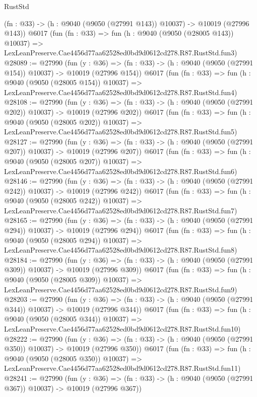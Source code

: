 \begin{lexlean}{RustStd}
\begin{coremodule}
{{    (fn : @33) -> (h : @9040 (@9050 (@27991 @143)) @10037) -> @10019 (@27996 @143))
    @6017
    (fun (fn : @33) =>
    fun (h : @9040 (@9050 (@28005 @143)) @10037) =>
    LexLeanPreserve.Cae4456d77aa62528ed0bd9d0612cd278.R87.RustStd.fun3)
@28089 := @27990
    (fun (y : @36) =>
    (fn : @33) -> (h : @9040 (@9050 (@27991 @154)) @10037) -> @10019 (@27996 @154))
    @6017
    (fun (fn : @33) =>
    fun (h : @9040 (@9050 (@28005 @154)) @10037) =>
    LexLeanPreserve.Cae4456d77aa62528ed0bd9d0612cd278.R87.RustStd.fun4)
@28108 := @27990
    (fun (y : @36) =>
    (fn : @33) -> (h : @9040 (@9050 (@27991 @202)) @10037) -> @10019 (@27996 @202))
    @6017
    (fun (fn : @33) =>
    fun (h : @9040 (@9050 (@28005 @202)) @10037) =>
    LexLeanPreserve.Cae4456d77aa62528ed0bd9d0612cd278.R87.RustStd.fun5)
@28127 := @27990
    (fun (y : @36) =>
    (fn : @33) -> (h : @9040 (@9050 (@27991 @207)) @10037) -> @10019 (@27996 @207))
    @6017
    (fun (fn : @33) =>
    fun (h : @9040 (@9050 (@28005 @207)) @10037) =>
    LexLeanPreserve.Cae4456d77aa62528ed0bd9d0612cd278.R87.RustStd.fun6)
@28146 := @27990
    (fun (y : @36) =>
    (fn : @33) -> (h : @9040 (@9050 (@27991 @242)) @10037) -> @10019 (@27996 @242))
    @6017
    (fun (fn : @33) =>
    fun (h : @9040 (@9050 (@28005 @242)) @10037) =>
    LexLeanPreserve.Cae4456d77aa62528ed0bd9d0612cd278.R87.RustStd.fun7)
@28165 := @27990
    (fun (y : @36) =>
    (fn : @33) -> (h : @9040 (@9050 (@27991 @294)) @10037) -> @10019 (@27996 @294))
    @6017
    (fun (fn : @33) =>
    fun (h : @9040 (@9050 (@28005 @294)) @10037) =>
    LexLeanPreserve.Cae4456d77aa62528ed0bd9d0612cd278.R87.RustStd.fun8)
@28184 := @27990
    (fun (y : @36) =>
    (fn : @33) -> (h : @9040 (@9050 (@27991 @309)) @10037) -> @10019 (@27996 @309))
    @6017
    (fun (fn : @33) =>
    fun (h : @9040 (@9050 (@28005 @309)) @10037) =>
    LexLeanPreserve.Cae4456d77aa62528ed0bd9d0612cd278.R87.RustStd.fun9)
@28203 := @27990
    (fun (y : @36) =>
    (fn : @33) -> (h : @9040 (@9050 (@27991 @344)) @10037) -> @10019 (@27996 @344))
    @6017
    (fun (fn : @33) =>
    fun (h : @9040 (@9050 (@28005 @344)) @10037) =>
    LexLeanPreserve.Cae4456d77aa62528ed0bd9d0612cd278.R87.RustStd.fun10)
@28222 := @27990
    (fun (y : @36) =>
    (fn : @33) -> (h : @9040 (@9050 (@27991 @350)) @10037) -> @10019 (@27996 @350))
    @6017
    (fun (fn : @33) =>
    fun (h : @9040 (@9050 (@28005 @350)) @10037) =>
    LexLeanPreserve.Cae4456d77aa62528ed0bd9d0612cd278.R87.RustStd.fun11)
@28241 := @27990
    (fun (y : @36) =>
    (fn : @33) -> (h : @9040 (@9050 (@27991 @367)) @10037) -> @10019 (@27996 @367))
}}
\end{coremodule}
\end{lexlean}
